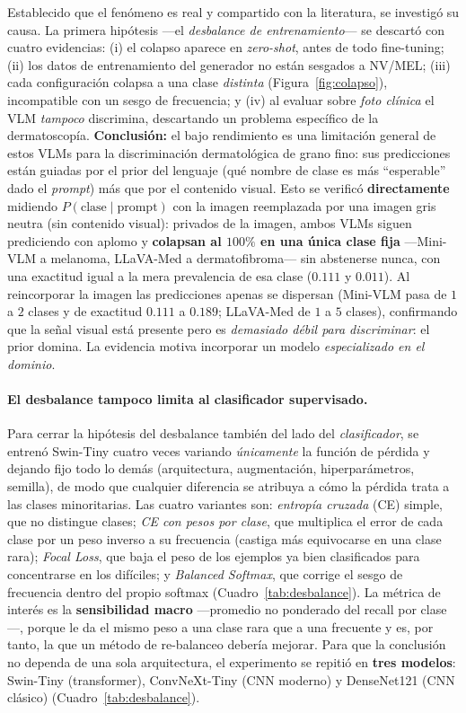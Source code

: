 \documentclass[11pt, a4paper]{article}
\begin{document}
Establecido que el fenómeno es real y compartido con la literatura, se investigó su causa. La primera
hipótesis —el \emph{desbalance de entrenamiento}— se descartó con cuatro evidencias: (i) el colapso 
aparece en \emph{zero-shot}, antes de todo fine-tuning; (ii) los
datos de entrenamiento del generador no están sesgados a NV/MEL; (iii) cada configuración colapsa a una
clase \emph{distinta} (Figura~\ref{fig:colapso}), incompatible con un sesgo de frecuencia; y (iv) al
evaluar sobre \emph{foto clínica} el VLM \emph{tampoco} discrimina, descartando un problema específico
de la dermatoscopía. \textbf{Conclusión:} el bajo rendimiento es una limitación general de
estos VLMs para la discriminación dermatológica de grano fino: sus predicciones están guiadas por el prior
del lenguaje (qué nombre de clase es más ``esperable'' dado el \emph{prompt}) más que por el contenido
visual. Esto se verificó \textbf{directamente} midiendo $P(\text{clase}\mid\text{prompt})$ con la imagen
reemplazada por una imagen gris neutra (sin contenido visual): privados de la imagen, ambos VLMs siguen
prediciendo con aplomo y \textbf{colapsan al $100\%$ en una única clase fija} —Mini-VLM a melanoma,
LLaVA-Med a dermatofibroma— sin abstenerse nunca, con una exactitud igual a la mera prevalencia de esa clase
($0.111$ y $0.011$). Al reincorporar la imagen las predicciones apenas se dispersan (Mini-VLM pasa de $1$ a
$2$ clases y de exactitud $0.111$ a $0.189$; LLaVA-Med de $1$ a $5$ clases), confirmando que la señal visual
está presente pero es \emph{demasiado débil para discriminar}: el prior domina. La evidencia motiva
incorporar un modelo \emph{especializado en el dominio}.

\paragraph{El desbalance tampoco limita al clasificador supervisado.} Para cerrar la hipótesis del
desbalance también del lado del \emph{clasificador}, se entrenó Swin-Tiny cuatro veces variando
\emph{únicamente} la función de pérdida y dejando fijo todo lo demás (arquitectura, augmentación,
hiperparámetros, semilla), de modo que cualquier diferencia se atribuya a cómo la pérdida trata a las
clases minoritarias. Las cuatro variantes son: \emph{entropía cruzada} (CE) simple, que no distingue
clases; \emph{CE con pesos por clase}, que multiplica el error de cada clase por un peso inverso a su
frecuencia (castiga más equivocarse en una clase rara); \emph{Focal Loss}, que baja el peso de los
ejemplos ya bien clasificados para concentrarse en los difíciles; y \emph{Balanced Softmax}, que corrige
el sesgo de frecuencia dentro del propio softmax (Cuadro~\ref{tab:desbalance}). La métrica de interés es
la \textbf{sensibilidad macro} —promedio no ponderado del recall por clase—, porque le da el mismo peso a
una clase rara que a una frecuente y es, por tanto, la que un método de re-balanceo debería mejorar. Para
que la conclusión no dependa de una sola arquitectura, el experimento se repitió en \textbf{tres modelos}:
Swin-Tiny (transformer), ConvNeXt-Tiny (CNN moderno) y DenseNet121 (CNN clásico) (Cuadro~\ref{tab:desbalance}).
\end{document}
